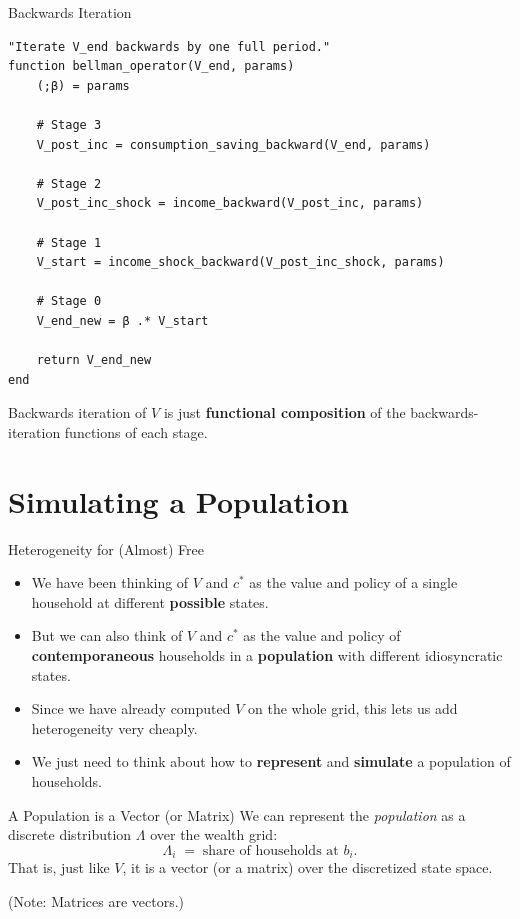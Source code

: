 \documentclass[10pt,aspectratio=169]{beamer}
\begin{document}
\begin{frame}[fragile]{Backwards Iteration}
  \begin{lstlisting}
"Iterate V_end backwards by one full period."
function bellman_operator(V_end, params)
    (;β) = params

    # Stage 3
    V_post_inc = consumption_saving_backward(V_end, params)

    # Stage 2
    V_post_inc_shock = income_backward(V_post_inc, params)

    # Stage 1
    V_start = income_shock_backward(V_post_inc_shock, params)

    # Stage 0
    V_end_new = β .* V_start

    return V_end_new
end
  \end{lstlisting}
  Backwards iteration of $V$ is just \textbf{functional composition} of the backwards-iteration functions of each stage.
\end{frame}

\section{Simulating a Population}

\begin{frame}{Heterogeneity for (Almost) Free}
  \begin{itemize}
    \item We have been thinking of $V$ and $c^*$ as the value and policy of a single household at different \textbf{possible} states.
    \item But we can also think of $V$ and $c^*$ as the value and policy of \textbf{contemporaneous} households in a \textbf{population} with different idiosyncratic states.
    \item Since we have already computed $V$ on the whole grid, this lets us add heterogeneity very cheaply.
    \item We just need to think about how to \textbf{represent} and \textbf{simulate} a population of households.
  \end{itemize}
\end{frame}

\begin{frame}{A Population is a Vector (or Matrix)}
  We can represent the \emph{population} as a discrete distribution $\Lambda$ over the wealth grid:
  \[
    \Lambda_i \;=\; \text{share of households at } b_i.
  \]
  That is, just like $V$, it is a vector (or a matrix) over the discretized state space.

  (Note: Matrices are vectors.)
\end{frame}
\end{document}
